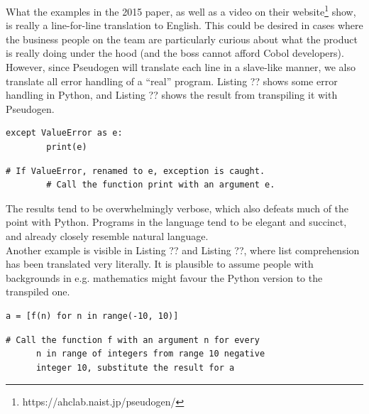 What the examples in the 2015 paper, as well as a video on their website\footnote{https://ahclab.naist.jp/pseudogen/} show, is really a line-for-line translation to English. This could be desired in cases where the business people on the team are particularly curious about what the product is really doing under the hood (and the boss cannot afford Cobol developers). \\

However, since Pseudogen will translate each line in a slave-like manner, we also translate all error handling of a ``real'' program. Listing ?? shows some error handling in Python, and Listing ?? shows the result from transpiling it with Pseudogen. \\

\begin{lstlisting}[caption={Error handling in Python}, captionpos=b, frame=trbl]
    except ValueError as e:
        print(e)
\end{lstlisting}

\begin{lstlisting}[caption={The result of transpiling the code in Listing ?? with Pseudogen}, captionpos=b, frame=trbl]
    # If ValueError, renamed to e, exception is caught.
        # Call the function print with an argument e.
\end{lstlisting}

The results tend to be overwhelmingly verbose, which also defeats much of the point with Python. Programs in the language tend to be elegant and succinct, and already closely resemble natural language. \hfill \\

Another example is visible in Listing ?? and Listing ??, where list comprehension has been translated very literally. It is plausible to assume people with backgrounds in e.g. mathematics might favour the Python version to the transpiled one. \hfill \\

\begin{lstlisting}[caption={A list comprehension of applying f(n) to integers in the range -10 to 10, and placing the results in a list}, captionpos=b, frame=trbl]
    a = [f(n) for n in range(-10, 10)]
\end{lstlisting}

\begin{lstlisting}[caption={The result of transpiling the code in Listing ?? with Pseudogen}, captionpos=b, frame=trbl]
    # Call the function f with an argument n for every
      n in range of integers from range 10 negative
      integer 10, substitute the result for a
\end{lstlisting}

